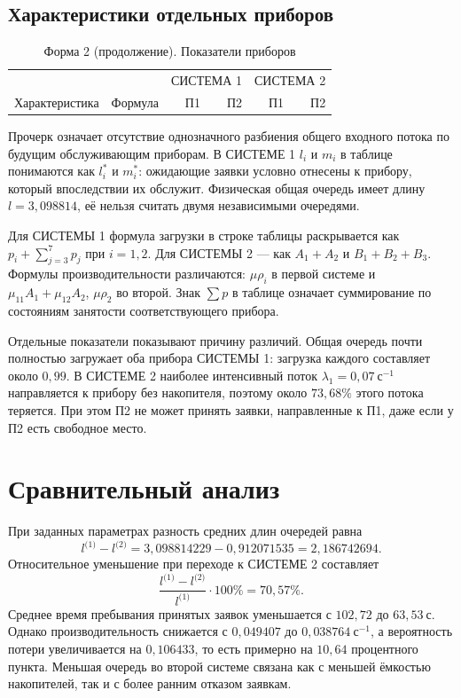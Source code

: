 \documentclass[11pt,a4paper]{article}
\newcommand{\sI}{\text{(1)}}
\newcommand{\sII}{\text{(2)}}
\newcommand{\secs}{\text{с}}
\begin{document}
\newpage
\subsection{Характеристики отдельных приборов}
\begin{table}[H]\centering
\caption{Форма 2 (продолжение). Показатели приборов}
\small\setlength{\tabcolsep}{5pt}
\begin{tabular}{llrrrr}
\toprule
& & \multicolumn{2}{c}{СИСТЕМА 1}&\multicolumn{2}{c}{СИСТЕМА 2}\\
Характеристика & Формула & П1 & П2 & П1 & П2\\\midrule

\end{tabular}
\end{table}
Прочерк означает отсутствие однозначного разбиения общего входного потока по будущим обслуживающим приборам. В СИСТЕМЕ 1 $l_i$ и $m_i$ в таблице понимаются как $l_i^*$ и $m_i^*$: ожидающие заявки условно отнесены к прибору, который впоследствии их обслужит. Физическая общая очередь имеет длину $l=3{,}098814$, её нельзя считать двумя независимыми очередями.

Для СИСТЕМЫ 1 формула загрузки в строке таблицы раскрывается как $p_i+\sum_{j=3}^{7}p_j$ при $i=1,2$. Для СИСТЕМЫ 2 --- как $A_1+A_2$ и $B_1+B_2+B_3$. Формулы производительности различаются: $\mu\rho_i$ в первой системе и $\mu_{11}A_1+\mu_{12}A_2$, $\mu\rho_2$ во второй. Знак $\sum p$ в таблице означает суммирование по состояниям занятости соответствующего прибора.

Отдельные показатели показывают причину различий. Общая очередь почти полностью загружает оба прибора СИСТЕМЫ 1: загрузка каждого составляет около $0{,}99$. В СИСТЕМЕ 2 наиболее интенсивный поток $\lambda_1=0{,}07\ \secs^{-1}$ направляется к прибору без накопителя, поэтому около $73{,}68\%$ этого потока теряется. При этом П2 не может принять заявки, направленные к П1, даже если у П2 есть свободное место.

\section{Сравнительный анализ}
При заданных параметрах разность средних длин очередей равна
\[
l^{\sI}-l^{\sII}=3{,}098814229-0{,}912071535=2{,}186742694.
\]
Относительное уменьшение при переходе к СИСТЕМЕ 2 составляет
\[
\frac{l^{\sI}-l^{\sII}}{l^{\sI}}\cdot100\%=70{,}57\%.
\]
Среднее время пребывания принятых заявок уменьшается с $102{,}72$ до $63{,}53\ \secs$. Однако производительность снижается с $0{,}049407$ до $0{,}038764\ \secs^{-1}$, а вероятность потери увеличивается на $0{,}106433$, то есть примерно на $10{,}64$ процентного пункта. Меньшая очередь во второй системе связана как с меньшей ёмкостью накопителей, так и с более ранним отказом заявкам.
\end{document}
